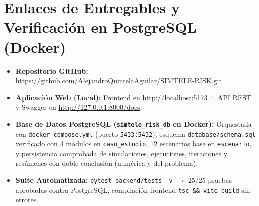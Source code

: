 \documentclass[11pt,a4paper]{article}
\begin{document}
\section{Enlaces de Entregables y Verificación en PostgreSQL (Docker)}
\begin{itemize}
    \item \textbf{Repositorio GitHub:} \url{https://github.com/AlejandroQuintelaAguilar/SIMTELE-RISK.git}
    \item \textbf{Aplicación Web (Local):} Frontend en \url{http://localhost:5173} · API REST y Swagger en \url{http://127.0.0.1:8000/docs}.
    \item \textbf{Base de Datos PostgreSQL (\texttt{simtele\_risk\_db} en Docker):} Orquestada con \texttt{docker-compose.yml} (puerto \texttt{5433:5432}), esquema \texttt{database/schema.sql} verificado con 4 módulos en \texttt{caso\_estudio}, 12 escenarios base en \texttt{escenario}, y persistencia comprobada de simulaciones, ejecuciones, iteraciones y resúmenes con doble conclusión (numérica y del problema).
    \item \textbf{Suite Automatizada:} \texttt{pytest backend/tests -v} $\rightarrow$ 25/25 pruebas aprobadas contra PostgreSQL; compilación frontend \texttt{tsc \&\& vite build} sin errores.
\end{itemize}
\end{document}
